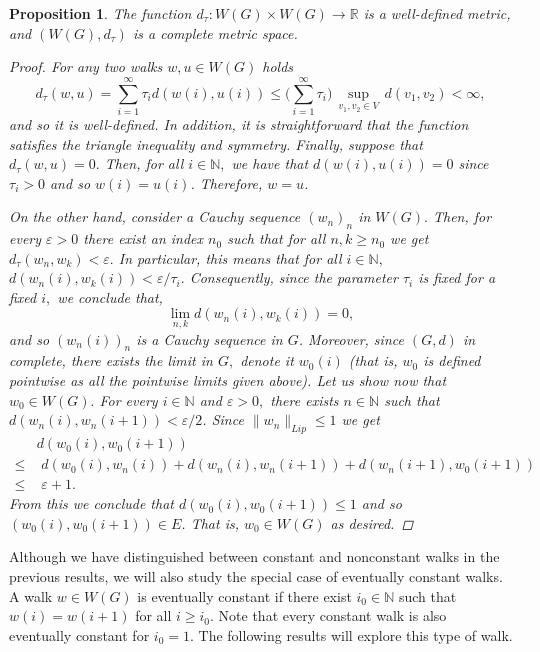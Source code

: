 \documentclass[preprint,12pt]{elsarticle}
\newtheorem{proposition}[theorem]{Proposition}
\begin{document}
\begin{proposition}\label{prop:com}
The function $d_\tau: W(G) \times W(G) \to \mathbb R$ is a well-defined metric, and $(W(G),d_\tau)$ is a complete metric space.
\begin{proof}
For any two walks $w,u \in W(G)$ holds
$$
d_\tau(w,u)= \sum_{i=1}^\infty \tau_i d(w(i),u(i)) \le \big( \sum_{i=1}^\infty \tau_i \big) \, \sup_{v_1,v_2 \in V} \, d(v_1,v_2)
<\infty,
$$
and so it is well-defined. In addition, it is straightforward that the function satisfies the triangle inequality and symmetry. Finally, suppose that $d_\tau(w,u)=0.$ Then, for all $i \in \mathbb N,$ we have that $d(w(i),u(i))=0$ since $\tau_i>0$ and so
$w(i)=u(i)$. Therefore, $w=u$.

On the other hand, consider a Cauchy sequence $(w_n)_n$ in $W(G).$ Then, for every $\varepsilon >0$ there exist an index $n_0$ such that for all $n,k \ge n_0$ we get $d_\tau(w_n,w_k) < \varepsilon.$
In particular, this means that for all $i \in \mathbb N,$ $d(w_n(i),w_k(i)) < \varepsilon/\tau_i.$ Consequently, since the parameter $\tau_i$ is fixed for a fixed $i,$ we conclude that, 
$$
\lim_{n,k} d(w_n(i),w_k(i)) = 0,
$$
and so $(w_n(i))_n$ is a Cauchy sequence in $G$. Moreover, since $(G,d)$ in complete, there exists the limit in $G,$ denote it $w_0(i)$ (that is, $w_0$ is defined pointwise as all the pointwise limits given above). Let us show now that $w_0 \in W(G).$ For every $i\in \mathbb N$ and $\varepsilon >0,$ 
there exists $n\in\mathbb N$ such that $d(w_n(i),w_n(i+1))<\varepsilon/2$. Since $\|w_n\|_{Lip} \le 1$ we get
\begin{align*}
     & d(w_0(i),w_0(i+1)) \\ \le & \,\, d(w_0(i),w_n(i)) + d(w_n(i),w_n(i+1))+ d(w_n(i+1),w_0(i+1)) \\
     \le& \,  \, \varepsilon + 1.
\end{align*}
From this we conclude that $d(w_0(i),w_0(i+1))\leq 1$ and so $(w_0(i),w_0(i+1))\in E$. That is, $w_0\in W(G)$ as desired.

\end{proof}
\end{proposition}

Although we have distinguished between constant and nonconstant walks in the previous results, we will also study the special case of eventually constant walks. A walk $w\in W(G)$ is eventually constant if there exist $i_0\in\mathbb N$ such that $w(i)=w(i+1)$ for all $i\geq i_0$. Note that every constant walk is also eventually constant for $i_0=1$. The following results will explore this type of walk.
\end{document}
